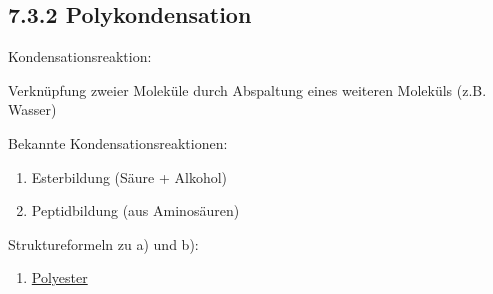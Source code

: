 \documentclass[../../main.tex]{subfiles}
\begin{document}
\subsection{7.3.2 Polykondensation}
Kondensationsreaktion:
\begin{center}
    Verknüpfung zweier Moleküle durch Abspaltung eines weiteren Moleküls (z.B.
    Wasser)
\end{center}
%
Bekannte Kondensationsreaktionen:
\begin{enumerate}[label=\alph*)]
    \item Esterbildung (Säure + Alkohol)
    \item Peptidbildung (aus Aminosäuren)
\end{enumerate}
%
Struktureformeln zu a) und b):
%
\begin{enumerate}[label=\alph*)]
    \item \underline{Polyester}


\end{enumerate}
\end{document}
